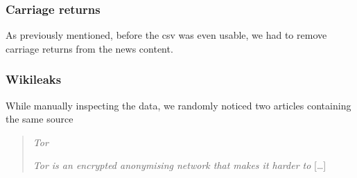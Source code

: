 \subsubsection{Carriage returns}
As previously mentioned, before the csv was even usable, we had to remove carriage returns from the news content.
\subsubsection{Wikileaks}
While manually inspecting the data, we randomly noticed two articles containing the same source
\begin{quote}
    \textit{Tor}

    \textit{Tor is an encrypted anonymising network that makes it harder to} [\dots]\\

\end{quote}

